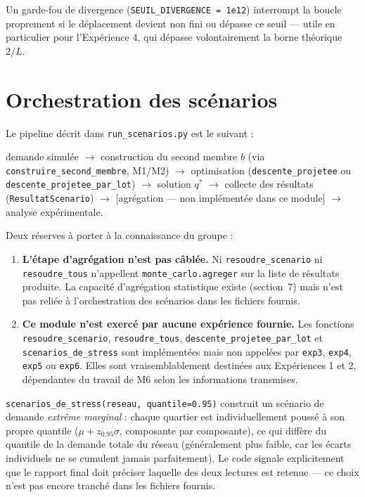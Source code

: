 \documentclass[11pt,a4paper]{article}
\begin{document}
Un garde-fou de divergence (\texttt{SEUIL\_DIVERGENCE = 1e12}) interrompt la
boucle proprement si le déplacement devient non fini ou dépasse ce seuil ---
utile en particulier pour l'Expérience 4, qui dépasse volontairement la borne
théorique $2/L$.

\section{Orchestration des scénarios}

Le pipeline décrit dans \texttt{run\_scenarios.py} est le suivant :

\begin{center}
demande simulée $\to$ construction du second membre $b$ (via
\texttt{construire\_second\_membre}, M1/M2) $\to$ optimisation
(\texttt{descente\_projetee} ou \texttt{descente\_projetee\_par\_lot}) $\to$
solution $q^*$ $\to$ collecte des résultats (\texttt{ResultatScenario}) $\to$
[agrégation --- non implémentée dans ce module] $\to$ analyse expérimentale.
\end{center}

Deux réserves à porter à la connaissance du groupe :

\begin{enumerate}
  \item \textbf{L'étape d'agrégation n'est pas câblée.} Ni
  \texttt{resoudre\_scenario} ni \texttt{resoudre\_tous} n'appellent
  \texttt{monte\_carlo.agreger} sur la liste de résultats produite. La
  capacité d'agrégation statistique existe (section~7) mais n'est pas
  reliée à l'orchestration des scénarios dans les fichiers fournis.
  \item \textbf{Ce module n'est exercé par aucune expérience fournie.} Les
  fonctions \texttt{resoudre\_scenario}, \texttt{resoudre\_tous},
  \texttt{descente\_projetee\_par\_lot} et \texttt{scenarios\_de\_stress}
  sont implémentées mais non appelées par \texttt{exp3}, \texttt{exp4},
  \texttt{exp5} ou \texttt{exp6}. Elles sont vraisemblablement destinées aux
  Expériences 1 et 2, dépendantes du travail de M6 selon les informations
  transmises.
\end{enumerate}

\texttt{scenarios\_de\_stress(reseau, quantile=0.95)} construit un scénario
de demande \emph{extrême marginal} : chaque quartier est individuellement
poussé à son propre quantile ($\mu + z_{0.95} \sigma$, composante par
composante), ce qui diffère du quantile de la demande totale du réseau
(généralement plus faible, car les écarts individuels ne se cumulent jamais
parfaitement). Le code signale explicitement que le rapport final doit
préciser laquelle des deux lectures est retenue --- ce choix n'est pas encore
tranché dans les fichiers fournis.
\end{document}
